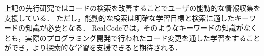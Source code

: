

上記の先行研究ではコードの検索を改善することでユーザの能動的な情報収集を支援している．
ただし，能動的な検索は明確な学習目標と検索に適したキーワードの知識が必要となる．
RealCodeでは，そのようなキーワードの知識がなくとも，実際のプログラミング開発で行われたコード変更を通した学習をすることができ，より探索的な学習を支援できると期待される．







